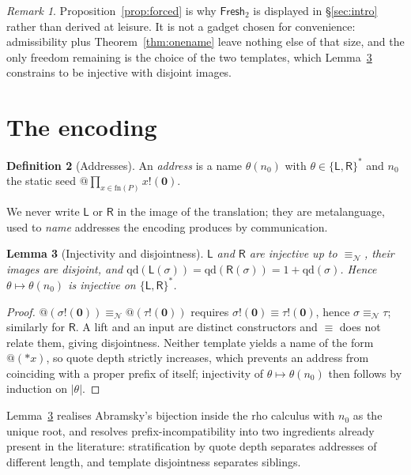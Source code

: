 \documentclass[11pt]{article}
\makeatletter
\theoremstyle{definition}
\newtheorem{definition}{Definition}[section]
\theoremstyle{plain}
\newtheorem{lemma}[definition]{Lemma}
\theoremstyle{remark}
\newtheorem{remark}[definition]{Remark}
\newcommand{\quo}[1]{@#1}
\newcommand{\drp}[1]{{*}#1}
\newcommand{\out}[2]{#1!(#2)}
\newcommand{\nequiv}{\equiv_{\mathcal{N}}}
\newcommand{\nil}{\mathbf{0}}
\newcommand{\Lft}{\mathsf{L}}
\newcommand{\Rgt}{\mathsf{R}}
\newcommand{\Frsh}{\mathsf{Fresh}_2}
\newcommand{\QD}{\mathrm{qd}}
\newcommand{\fn}{\mathrm{fn}}
\makeatother
\begin{document}
\begin{remark}
Proposition~\ref{prop:forced} is why $\Frsh$ is displayed in
\S\ref{sec:intro} rather than derived at leisure. It is not a gadget
chosen for convenience: admissibility plus
Theorem~\ref{thm:onename} leave nothing else of that size, and the only
freedom remaining is the choice of the two templates, which
Lemma~\ref{lem:templates} constrains to be injective with disjoint
images.
\end{remark}

\section{The encoding}\label{sec:encoding}

\begin{definition}[Addresses]
An \emph{address} is a name $\theta(n_0)$ with
$\theta \in \{\Lft,\Rgt\}^*$ and $n_0$ the static seed
$\quo{\prod_{x \in \fn(P)} \out{x}{\nil}}$.
\end{definition}

We never write $\Lft$ or $\Rgt$ in the image of the translation; they are
metalanguage, used to \emph{name} addresses the encoding produces by
communication.

\begin{lemma}[Injectivity and disjointness]\label{lem:templates}
$\Lft$ and $\Rgt$ are injective up to $\nequiv$, their images are
disjoint, and $\QD(\Lft(\sigma)) = \QD(\Rgt(\sigma)) = 1 + \QD(\sigma)$.
Hence $\theta \mapsto \theta(n_0)$ is injective on $\{\Lft,\Rgt\}^*$.
\end{lemma}

\begin{proof}
$\quo{(\out{\sigma}{\nil})} \nequiv \quo{(\out{\tau}{\nil})}$ requires
$\out{\sigma}{\nil} \equiv \out{\tau}{\nil}$, hence $\sigma \nequiv \tau$;
similarly for $\Rgt$. A lift and an input are distinct constructors and
$\equiv$ does not relate them, giving disjointness. Neither template
yields a name of the form $\quo{(\drp{x})}$, so quote depth strictly
increases, which prevents an address from coinciding with a proper prefix
of itself; injectivity of $\theta \mapsto \theta(n_0)$ then follows by
induction on $|\theta|$.
\end{proof}

Lemma~\ref{lem:templates} realises Abramsky's bijection inside the rho
calculus with $n_0$ as the unique root, and resolves
prefix-incompatibility into two ingredients already present in the
literature: stratification by quote depth separates addresses of
different length, and template disjointness separates siblings.
\end{document}
